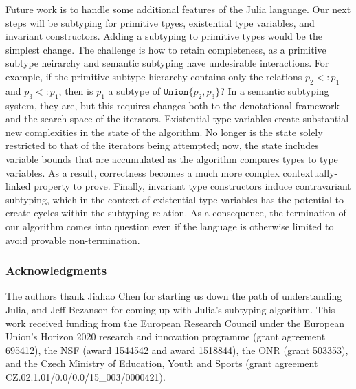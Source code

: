 \documentclass[a4paper,english]{lipics-v2019}
\newcommand{\xt}[1]{\texttt{#1}}
\newcommand{\union}[2]{\xt{Union\{}#1,#2\xt{\}}}
\newcommand{\sub}{<:}
\begin{document}
Future work is to handle some additional features of the Julia language.
Our next steps will be subtyping for primitive tpyes, existential type
variables, and invariant constructors.  Adding a subtyping to primitive
types would be the simplest change. The challenge is how to retain
completeness, as a primitive subtype heirarchy and semantic subtyping have
undesirable interactions.  For example, if the primitive subtype hierarchy
contains only the relations $p_2 \sub p_1$ and $p_3 \sub p_1$, then is
$p_1$ a subtype of $\union{p_2}{p_3}$? In a semantic subtyping system, they
are, but this requires changes both to the denotational framework and the
search space of the iterators.  Existential type variables create
substantial new complexities in the state of the algorithm. No longer is the
state solely restricted to that of the iterators being attempted; now, the
state includes variable bounds that are accumulated as the algorithm
compares types to type variables. As a result, correctness becomes a much
more complex contextually-linked property to prove.  Finally, invariant type
constructors induce contravariant subtyping, which in the context of
existential type variables has the potential to create cycles within the
subtyping relation. As a consequence, the termination of our algorithm comes
into question even if the language is otherwise limited to avoid provable
non-termination.

\medskip

\subsubsection*{Acknowledgments}
The authors thank Jiahao Chen for starting us down the path of understanding
Julia, and Jeff Bezanson for coming up with Julia's subtyping algorithm.  This
work received funding from the European Research Council under the European
Union's Horizon 2020 research and innovation programme (grant agreement
695412), the NSF (award 1544542 and award 1518844), the ONR (grant 503353), and the Czech Ministry of
Education, Youth and Sports (grant agreement
CZ.02.1.01/0.0/0.0/15\_003/0000421).
 

%

\end{document}
